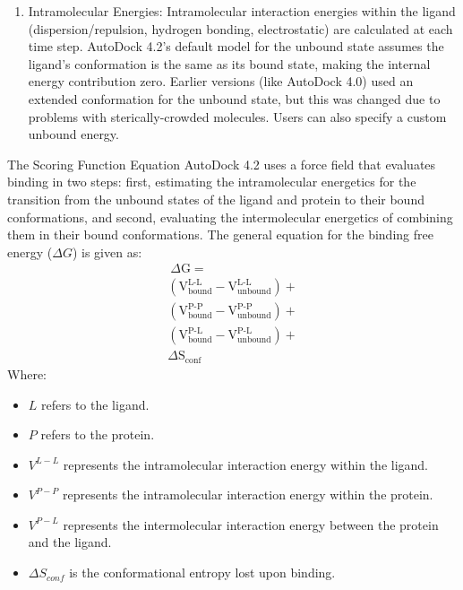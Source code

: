\documentclass[11pt]{article}
\begin{document}
\begin{enumerate}
\item Intramolecular Energies: Intramolecular interaction energies within the ligand (dispersion/repulsion, hydrogen bonding, electrostatic) are calculated at each time step. AutoDock 4.2's default model for the unbound state assumes the ligand's conformation is the same as its bound state, making the internal energy contribution zero. Earlier versions (like AutoDock 4.0) used an extended conformation for the unbound state, but this was changed due to problems with sterically-crowded molecules. Users can also specify a custom unbound energy.
\end{enumerate}
The Scoring Function Equation
AutoDock 4.2 uses a force field that evaluates binding in two steps: first, estimating the intramolecular energetics for the transition from the unbound states of the ligand and protein to their bound conformations, and second, evaluating the intermolecular energetics of combining them in their bound conformations.
The general equation for the binding free energy ($\Delta G$) is given as:
\begin{equation} \label{eq:AUTODOCKscore-1}
\begin{split}
   \ \Delta \text{G} = \\ 
                        (\text{V}_{\text{bound}}^{\text{L-L}} - \text{V}_{\text{unbound}}^{\text{L-L}}) + \\ 
                        (\text{V}_{\text{bound}}^{\text{P-P}} - \text{V}_{\text{unbound}}^{\text{P-P}}) + \\ 
                        (\text{V}_{\text{bound}}^{\text{P-L}} - \text{V}_{\text{unbound}}^{\text{P-L}}) + \\
                        \Delta \text{S}_{\text{conf}}
\end{split}
\end{equation}
Where:
\begin{itemize}
    \item $L$ refers to the ligand.
    \item $P$ refers to the protein.
    \item $V^{L-L}$ represents the intramolecular interaction energy within the ligand.
    \item $V^{P-P}$ represents the intramolecular interaction energy within the protein.
    \item $V^{P-L}$ represents the intermolecular interaction energy between the protein and the ligand.
    \item $\Delta S_{conf}$ is the conformational entropy lost upon binding.
\end{itemize}
\end{document}
